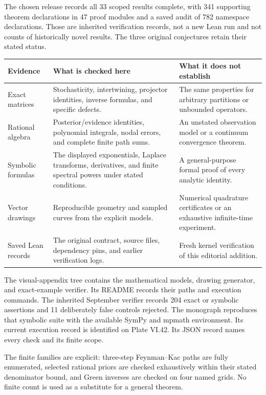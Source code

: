 The chosen release records all 33 scoped results complete, with 341 supporting theorem declarations in 47 proof modules and a saved audit of 782 namespace declarations. Those are inherited verification records, not a new Lean run and not counts of historically novel results. The three original conjectures retain their stated status.
\begin{tabularx}{\linewidth}{@{}>{\raggedright\arraybackslash}p{1.22in}YY@{}}
\toprule
Evidence & What is checked here & What it does not establish\\
\midrule
Exact matrices & Stochasticity, intertwining, projector identities, inverse formulas, and specific defects. & The same properties for arbitrary partitions or unbounded operators.\\
Rational algebra & Posterior/evidence identities, polynomial integrals, nodal errors, and complete finite path sums. & An unstated observation model or a continuum convergence theorem.\\
Symbolic formulas & The displayed exponentials, Laplace transforms, derivatives, and finite spectral powers under stated conditions. & A general-purpose formal proof of every analytic identity.\\
Vector drawings & Reproducible geometry and sampled curves from the explicit models. & Numerical quadrature certificates or an exhaustive infinite-time experiment.\\
Saved Lean records & The original contract, source files, dependency pins, and earlier verification logs. & Fresh kernel verification of this editorial addition.\\
\bottomrule
\end{tabularx}
The visual-appendix tree contains the mathematical models, drawing generator, and exact-example verifier. Its README records their paths and execution commands. The inherited September verifier records 204 exact or symbolic assertions and 11 deliberately false controls rejected. The monograph reproduces that symbolic suite with the available SymPy and mpmath environment. Its current execution record is identified on Plate VI.42. Its JSON record names every check and its finite scope.

The finite families are explicit: three-step Feynman--Kac paths are fully enumerated, selected rational priors are checked exhaustively within their stated denominator bound, and Green inverses are checked on four named grids. No finite count is used as a substitute for a general theorem.

